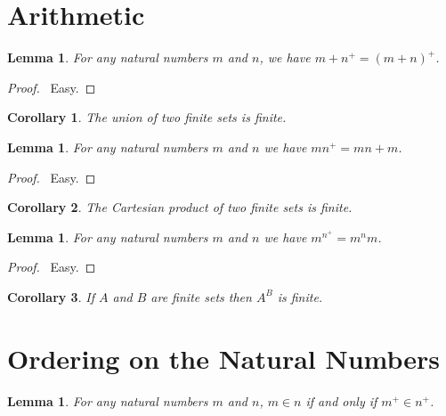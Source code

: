 \documentclass{article}
\let\qed\relax
\newtheorem{lemma}[axiom]{Lemma}
\newtheorem{corollary}{Corollary}[axiom]
\theoremstyle{definition}
\begin{document}
    \section{Arithmetic}

    \begin{lemma}
        For any natural numbers $m$ and $n$, we have $m + n^+ = (m+n)^+$.
    \end{lemma}

    \begin{proof}
        \pf\ Easy. \qed
    \end{proof}

    \begin{corollary}
        The union of two finite sets is finite.
    \end{corollary}

    \begin{lemma}
        For any natural numbers $m$ and $n$ we have $m n^+ = mn + m$.
    \end{lemma}

    \begin{proof}
        \pf\ Easy. \qed
    \end{proof}

    \begin{corollary}
        The Cartesian product of two finite sets is finite.
    \end{corollary}

    \begin{lemma}
        For any natural numbers $m$ and $n$ we have $m^{n^+} = m^n m$.
    \end{lemma}

    \begin{proof}
        \pf\ Easy. \qed
    \end{proof}

    \begin{corollary}
        If $A$ and $B$ are finite sets then $A^B$ is finite.
    \end{corollary}

    \section{Ordering on the Natural Numbers}

    \begin{lemma}
        \label{lemma:natural_number_order_successor}
        For any natural numbers $m$ and $n$, $m \in n$ if and only if $m^+ \in n^+$.
    \end{lemma}
\end{document}
